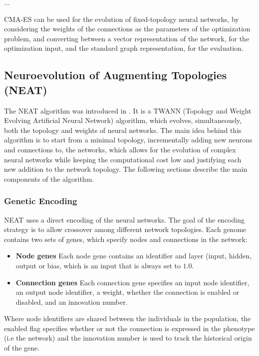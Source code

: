 ...


CMA-ES can be used for the evolution of fixed-topology neural networks, by considering the weights of the connections as the parameters of the optimization problem,
and converting between a vector representation of the network, for the optimization input, and the standard graph representation, for the evaluation.

\subsection{Neuroevolution of Augmenting Topologies (NEAT)}

The NEAT algorithm was introduced in \cite{neat}. It is a TWANN (Topology and Weight Evolving Artificial Neural Network) algorithm, which evolves, simultaneously,  both
the topology and weights of neural networks. The main idea behind this algorithm is to start from a minimal topology, incrementally adding new neurons and connections to,
the networks, which allows for the evolution of complex neural networks while keeping the computational cost low and justifying each new addition to the network topology.
The following sections describe the main components of the algorithm.

\subsubsection{Genetic Encoding}

NEAT uses a direct encoding of the neural networks. The goal of the encoding strategy is to allow crossover among different network topologies.
Each genome contains two sets of genes, which specify nodes and connections in the network:

\begin{itemize}
    \item \textbf{Node genes} Each node gene contains an identifier and layer (input, hidden, output or bias, which is an input that is always set to $1.0$.
    \item \textbf{Connection genes} Each connection gene specifies an input node identifier, an output node identifier, a weight, whether the connection is enabled or
        disabled, and an innovation number.
\end{itemize}


Where node identifiers are shared between the individuals in the population, the enabled flag specifies whether or not the connection is expressed in the phenotype (i.e
the network) and the innovation number is used to track the historical origin of the gene.

